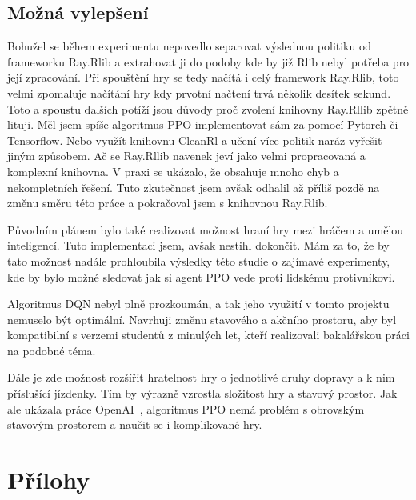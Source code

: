 \section*{Možná vylepšení}
\label{sec:mozna-vylepseni}

Bohužel se během experimentu nepovedlo separovat výslednou politiku od frameworku Ray.Rlib a extrahovat ji do podoby kde by již Rlib nebyl potřeba pro její zpracování.
Při spouštění hry se tedy načítá i celý framework Ray.Rlib, toto velmi zpomaluje načítání hry kdy prvotní načtení trvá několik desítek sekund.
Toto a spoustu dalších potíží jsou důvody proč zvolení knihovny Ray.Rllib zpětně lituji.
Měl jsem spíše algoritmus PPO implementovat sám za pomocí Pytorch či Tensorflow.
Nebo využít knihovnu CleanRl a učení více politik naráz vyřešit jiným způsobem.
Ač se Ray.Rllib navenek jeví jako velmi propracovaná a komplexní knihovna.
V praxi se ukázalo, že obsahuje mnoho chyb a nekompletních řešení.
Tuto zkutečnost jsem avšak odhalil až příliš pozdě na změnu směru této práce a pokračoval jsem s knihovnou Ray.Rlib.

Původním plánem bylo také realizovat možnost hraní hry mezi hráčem a umělou inteligencí.
Tuto implementaci jsem, avšak nestihl dokončit.
Mám za to, že by tato možnost nadále prohloubila výsledky této studie o zajímavé experimenty, kde by bylo možné sledovat jak si agent PPO vede proti lidskému protivníkovi.

Algoritmus DQN nebyl plně prozkoumán, a tak jeho využití v tomto projektu nemuselo být optimální.
Navrhuji změnu stavového a akčního prostoru, aby byl kompatibilní s verzemi studentů z minulých let, kteří realizovali bakalářskou práci na podobné téma.

Dále je zde možnost rozšířit hratelnost hry o jednotlivé druhy dopravy a k nim příslušící jízdenky.
Tím by výrazně vzrostla složitost hry a stavový prostor.
Jak ale ukázala práce OpenAI~\cite{Dota2}, algoritmus PPO nemá problém s obrovským stavovým prostorem a naučit se i komplikované hry.

\chapter{Přílohy}
\label{ch:prilohy}




%
